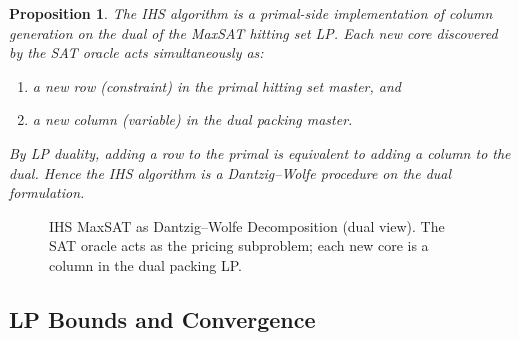 \documentclass[11pt,a4paper]{article}
\newtheorem{proposition}{Proposition}
\begin{document}
\begin{proposition}
The IHS algorithm is a primal-side implementation of column generation on
the dual of the MaxSAT hitting set LP. Each new core discovered by the SAT
oracle acts simultaneously as:
\begin{enumerate}
\item a new \emph{row} (constraint) in the primal hitting set master, and
\item a new \emph{column} (variable) in the dual packing master.
\end{enumerate}
By LP duality, adding a row to the primal is equivalent to adding a column to
the dual. Hence the IHS algorithm is a Dantzig--Wolfe procedure on the dual
formulation.
\end{proposition}

\begin{figure}[t]
\centering
{}
\caption{IHS MaxSAT as Dantzig--Wolfe Decomposition (dual view). The SAT oracle acts as the pricing subproblem; each new core is a column in the dual packing LP.}
\label{fig:dw}
\end{figure}

\subsection{LP Bounds and Convergence}
\end{document}
